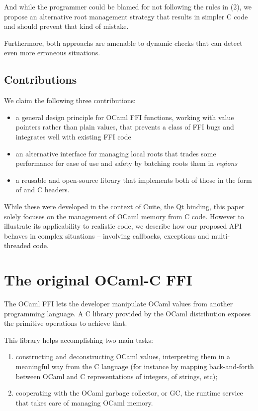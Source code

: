 \documentclass[a4paper]{easychair}
\newcommand{\cpp}[1]{\smash{\lstinline[style=C++]{#1}}}
\begin{document}
And while the programmer could be blamed for not following the rules in
(2), we propose an alternative root management strategy that results in simpler
C code and should prevent that kind of mistake.

Furthermore, both approachs are amenable to dynamic checks that can detect even
more erroneous situations.

\subsection{Contributions}

We claim the following three contributions:

\begin{itemize}
\item a general design principle for OCaml FFI functions, working with value
      pointers rather than plain values, that prevents a class of FFI bugs and
      integrates well with existing FFI code
\item an alternative interface for managing local roots that trades some
      performance for ease of use and safety by batching roots them in
      {\em regions}
\item a reusable and open-source library that implements both of those in the
      form of \cpp{mlroot.h} and \cpp{mlregion.h} C headers.
\end{itemize}

While these were developed in the context of Cuite, the Qt binding, this
paper solely focuses on the management of OCaml memory from C code.
However to illustrate its applicability to realistic code, we describe
how our proposed API behaves in complex situations -- involving
callbacks, exceptions and multi-threaded code.

\section{The original OCaml-C FFI}

The OCaml FFI lets the developer manipulate OCaml values from another
programming language. A C library provided by the OCaml distribution
exposes the primitive operations to achieve that.

This library helps accomplishing two main tasks:

\begin{enumerate}
\item constructing and deconstructing OCaml values, interpreting them in a
      meaningful way from the C language (for instance by mapping
      back-and-forth between OCaml and C representations of integers, of
      strings, etc);
\item cooperating with the OCaml garbage collector, or GC, the runtime
      service that takes care of managing OCaml memory.
\end{enumerate}
\end{document}
